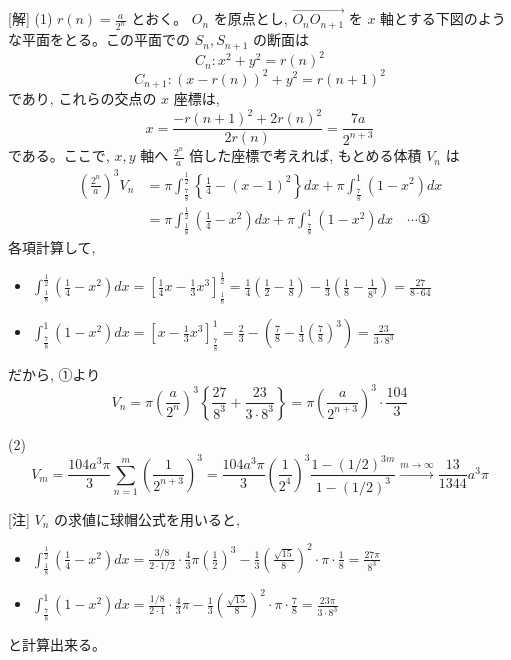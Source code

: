 \documentclass[../main.tex]{subfiles}
\begin{document}
[解] (1) $r(n) = \frac{a}{2^n}$ とおく。 $O_n$ を原点とし, $\vec{O_n O_{n+1}}$ を $x$ 軸とする下図のような平面をとる。この平面での $S_n, S_{n+1}$ の断面は
\[
  C_n : x^2 + y^2 = r(n)^2
\]
\[
  C_{n+1} : (x - r(n))^2 + y^2 = r(n+1)^2
\]
であり, これらの交点の $x$ 座標は,
\[
  x = \frac{-r(n+1)^2 + 2r(n)^2}{2r(n)} = \frac{7a}{2^{n+3}}
\]
である。ここで, $x, y$ 軸へ $\frac{2^n}{a}$ 倍した座標で考えれば, もとめる体積 $V_n$ は
\[
  \begin{aligned}
    \left( \frac{2^n}{a} \right)^3 V_n &= \pi \int_{\frac{7}{8}}^{\frac{1}{2}} \left\{ \frac{1}{4} - (x-1)^2 \right\} dx + \pi \int_{\frac{7}{8}}^1 (1 - x^2) dx \\
    &= \pi \int_{\frac{1}{8}}^{\frac{1}{2}} \left( \frac{1}{4} - x^2 \right) dx + \pi \int_{\frac{7}{8}}^1 (1 - x^2) dx \quad \cdots \text{①}
  \end{aligned}
\]
各項計算して,
\begin{itemize}
  \item $\displaystyle \int_{\frac{1}{8}}^{\frac{1}{2}} \left(\frac{1}{4} - x^2\right) dx = \left[ \frac{1}{4} x - \frac{1}{3} x^3 \right]_{\frac{1}{8}}^{\frac{1}{2}} = \frac{1}{4} \left( \frac{1}{2} - \frac{1}{8} \right) - \frac{1}{3} \left( \frac{1}{8} - \frac{1}{8^3} \right) = \frac{27}{8 \cdot 64}$
  \item $\displaystyle \int_{\frac{7}{8}}^1 (1 - x^2) dx = \left[ x - \frac{1}{3} x^3 \right]_{\frac{7}{8}}^1 = \frac{2}{3} - \left( \frac{7}{8} - \frac{1}{3} \left( \frac{7}{8} \right)^3 \right) = \frac{23}{3 \cdot 8^3}$
\end{itemize}
だから, ①より
\[
  V_n = \pi \left(\frac{a}{2^n}\right)^3 \left\{ \frac{27}{8^3} + \frac{23}{3 \cdot 8^3} \right\} = \pi \left(\frac{a}{2^{n+3}}\right)^3 \cdot \frac{104}{3}
\]

(2)
\[
  V_m = \frac{104 a^3 \pi}{3} \sum_{n=1}^m \left(\frac{1}{2^{n+3}}\right)^3 = \frac{104 a^3 \pi}{3} \left(\frac{1}{2^4}\right)^3 \frac{1 - (1/2)^{3m}}{1 - (1/2)^3} \xrightarrow{m \to \infty} \frac{13}{1344} a^3 \pi
\]

[注]
$V_n$ の求値に球帽公式を用いると,
\begin{itemize}
  \item $\displaystyle \int_{\frac{1}{8}}^{\frac{1}{2}} \left(\frac{1}{4} - x^2\right) dx = \frac{3/8}{2 \cdot 1/2} \cdot \frac{4}{3} \pi \left(\frac{1}{2}\right)^3 - \frac{1}{3} \left(\frac{\sqrt{15}}{8}\right)^2 \cdot \pi \cdot \frac{1}{8} = \frac{27 \pi}{8^3}$
  \item $\displaystyle \int_{\frac{7}{8}}^1 (1 - x^2) dx = \frac{1/8}{2 \cdot 1} \cdot \frac{4}{3} \pi - \frac{1}{3} \left(\frac{\sqrt{15}}{8}\right)^2 \cdot \pi \cdot \frac{7}{8} = \frac{23 \pi}{3 \cdot 8^3}$
\end{itemize}
と計算出来る。
\end{document}
